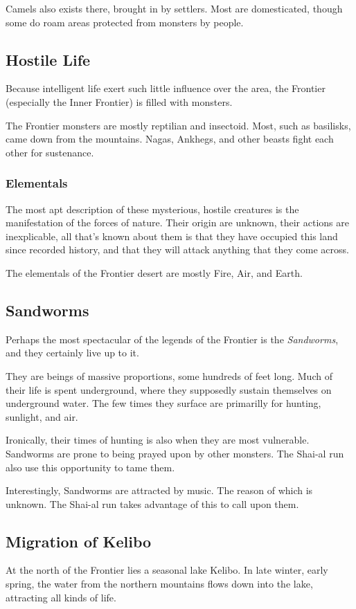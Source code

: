 \documentclass[../main.tex]{subfiles}
\begin{document}
Camels also exists there, brought in by settlers. Most are domesticated,
though some do roam areas protected from monsters by people.

\subsection{Hostile Life}
Because intelligent life exert such little influence over the area, the
Frontier (especially the Inner Frontier) is filled with monsters.

The Frontier monsters are mostly reptilian and insectoid.
Most, such as basilisks, came down from the mountains. Nagas,
Ankhegs, and other beasts fight each other for sustenance.

\subsubsection{Elementals}
The most apt description of these mysterious, hostile creatures is
the manifestation of the forces of nature. Their origin are unknown,
their actions are inexplicable, all that's known about them is that
they have occupied this land since recorded history, and that
they will attack anything that they come across.

The elementals of the Frontier desert are mostly Fire, Air, and Earth.

\subsection{Sandworms}
Perhaps the most spectacular of the legends of the Frontier is the \emph{Sandworms},
and they certainly live up to it.

They are beings of massive proportions, some hundreds of feet long.
Much of their life is spent underground, where they supposedly
sustain themselves on underground water. The few times they surface
are primarilly for hunting, sunlight, and air.

Ironically, their times of hunting is also when they are most
vulnerable. Sandworms are prone to being prayed upon by other monsters.
The Shai-al run also use this opportunity to tame them.

Interestingly, Sandworms are attracted by music. The reason of which is
unknown. The Shai-al run takes advantage of this to call upon them.

\subsection{Migration of Kelibo}
At the north of the Frontier lies a seasonal lake Kelibo. In late winter,
early spring, the water from the northern mountains flows down into the
lake, attracting all kinds of life.
\end{document}
